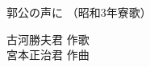 \documentclass[10pt,b5j]{tarticle} %
\begin{document}
\begin{minipage}[c]{0.7\hsize} %
    \begin{center}
        {\LARGE
            郭公の声に %
        }
        {\small 
            （昭和3年寮歌） %
        }
    \end{center}
\end{minipage}
\begin{minipage}[c]{0.3\hsize} %
    \begin{flushright} %
        古河勝夫君 作歌\\宮本正治君 作曲 %
    \end{flushright}
\end{minipage}
\end{document}
